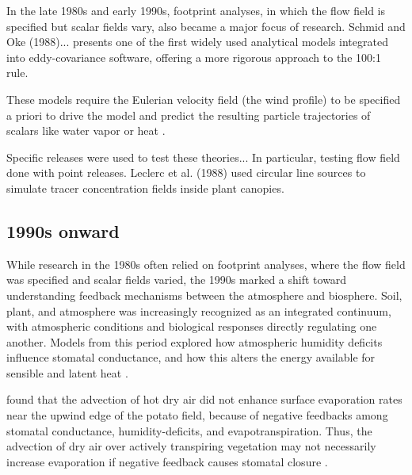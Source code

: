 \documentclass{article}
\begin{document}
    In the late 1980s and early 1990s, footprint analyses, in which the flow field is specified but scalar fields vary, also became a major focus of research.
    Schmid and Oke (1988)...
    \citet{schuepp1990footprint} presents one of the first widely used analytical models integrated into eddy-covariance software, offering a more rigorous approach to the 100:1 rule.

    These models require the Eulerian velocity field (the wind profile) to be specified a priori to drive the model and predict the resulting particle trajectories of scalars like water vapor or heat \cite{hsieh_lagrangian_1997}.

    Specific releases were used to test these theories...  
    In particular, testing flow field done with point releases.
    Leclerc et al. (1988) used circular line sources to simulate tracer concentration fields inside plant canopies. 

    \subsection*{1990s onward}

     While research in the 1980s often relied on footprint analyses,  where the flow field was specified and scalar fields varied, the 1990s marked a shift toward understanding  feedback mechanisms between  the atmosphere and  biosphere.
     Soil, plant, and atmosphere was increasingly recognized as an integrated continuum, with atmospheric conditions and biological responses directly regulating one another.
     Models from this period 
     explored how atmospheric humidity deficits influence stomatal conductance, and how this alters the energy available for sensible and latent heat \cite{baldocchi1995intra}.

     

    
    \citet{baldocchi_intra-field_1995} found that the advection of hot dry air did not enhance surface evaporation rates near the upwind edge of the potato field, because of negative feedbacks among stomatal conductance, humidity-deficits, and evapotranspiration.
    Thus, the advection of dry air over actively transpiring vegetation may not necessarily increase evaporation if negative feedback causes stomatal closure \cite{philip1987advection, baldocchi1995intra}. 
\end{document}
